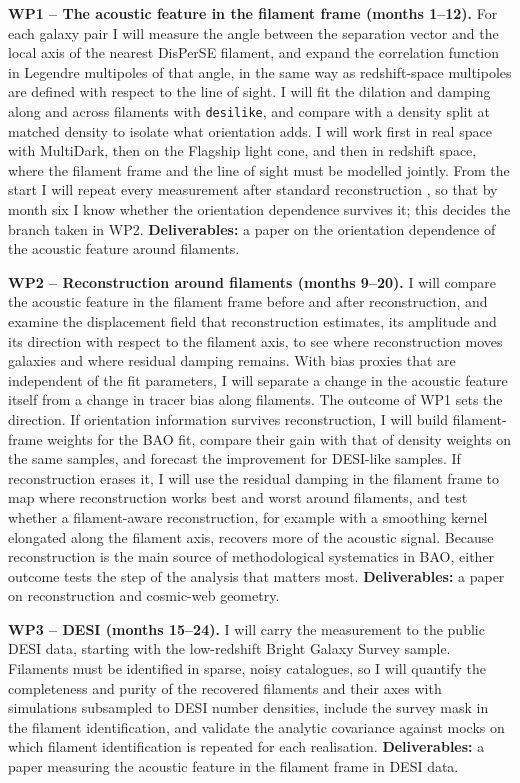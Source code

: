 \documentclass[11pt,a4paper]{article}
\newcommand{\desilike}{\texttt{desilike}}
\begin{document}
\textbf{WP1 -- The acoustic feature in the filament frame (months 1--12).} For each galaxy pair I will measure the angle between the separation vector and the local axis of the nearest DisPerSE filament, and expand the correlation function in Legendre multipoles of that angle, in the same way as redshift-space multipoles are defined with respect to the line of sight. I will fit the dilation and damping along and across filaments with \desilike, and compare with a density split at matched density to isolate what orientation adds. I will work first in real space with MultiDark, then on the Flagship light cone, and then in redshift space, where the filament frame and the line of sight must be modelled jointly. From the start I will repeat every measurement after standard reconstruction \citep{Eisenstein2007}, so that by month six I know whether the orientation dependence survives it; this decides the branch taken in WP2. \textbf{Deliverables:} a paper on the orientation dependence of the acoustic feature around filaments.

\textbf{WP2 -- Reconstruction around filaments (months 9--20).} I will compare the acoustic feature in the filament frame before and after reconstruction, and examine the displacement field that reconstruction estimates, its amplitude and its direction with respect to the filament axis, to see where reconstruction moves galaxies and where residual damping remains. With bias proxies that are independent of the fit parameters, I will separate a change in the acoustic feature itself from a change in tracer bias along filaments. The outcome of WP1 sets the direction. If orientation information survives reconstruction, I will build filament-frame weights for the BAO fit, compare their gain with that of density weights on the same samples, and forecast the improvement for DESI-like samples. If reconstruction erases it, I will use the residual damping in the filament frame to map where reconstruction works best and worst around filaments, and test whether a filament-aware reconstruction, for example with a smoothing kernel elongated along the filament axis, recovers more of the acoustic signal. Because reconstruction is the main source of methodological systematics in BAO, either outcome tests the step of the analysis that matters most. \textbf{Deliverables:} a paper on reconstruction and cosmic-web geometry.

\textbf{WP3 -- DESI (months 15--24).} I will carry the measurement to the public DESI data, starting with the low-redshift Bright Galaxy Survey sample. Filaments must be identified in sparse, noisy catalogues, so I will quantify the completeness and purity of the recovered filaments and their axes with simulations subsampled to DESI number densities, include the survey mask in the filament identification, and validate the analytic covariance against mocks on which filament identification is repeated for each realisation. \textbf{Deliverables:} a paper measuring the acoustic feature in the filament frame in DESI data.
\end{document}
